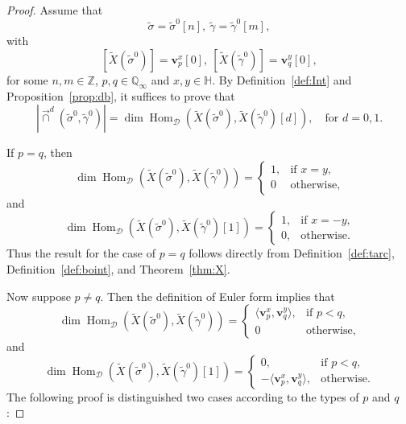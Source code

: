 \documentclass[11pt,a4paper,reqno]{amsart}%
\theoremstyle{plain}
\theoremstyle{definition}
\numberwithin{equation}{section}
\numberwithin{equation}{section}
\def\<{\langle}
\def\>{\rangle}
\def\ZZ{\mathbb{Z}}
\newcommand{\cD}{\mathcal{D}}
\newcommand{\QQi}{\mathbb{Q}_\infty}
\newcommand{\Hom}{\operatorname{Hom}\nolimits}
\newcommand{\bv}{\mathbf{v}}
\def\Hom{\operatorname{Hom}}
\def\wX{\widetilde{X}}
\newcommand{\bfH}{\mathbb{H}}
\begin{document}
 \begin{proof} 
 Assume that
 \[\widetilde{\sigma}=\widetilde{\sigma}^0[n],\ \widetilde{\gamma}=\widetilde{\gamma}^0[m],\] with
 \[[\wX(\widetilde{\sigma}^0)]  =\bv_p^x[0],\  [ \wX(\widetilde{\gamma}^0)]  =\bv_q^y[0],\] 
for some $n,m\in\ZZ$, $p, q\in\QQi$ and $x,y\in\bfH$.
By  Definition~\ref{def:Int}  and Proposition~\ref{prop:db}, it suffices to prove that  
\begin{equation}
\label{int=dimH}|\overrightarrow{\cap}^d(\widetilde{\sigma}^0 ,\widetilde{\gamma}^0 )|=\dim\Hom_{\cD} ( \wX(\widetilde{\sigma}^0),\wX(\widetilde{\gamma}^0) [d] ),  \quad \text{for } d = 0, 1.
\end{equation} 

If  $p = q$, then 
\[
\dim\Hom_{\cD} ( \wX(\widetilde{\sigma}^0),\wX(\widetilde{\gamma}^0) )=\begin{cases}
   1, &\text{if $x=y$,}\\
    0&\text{otherwise,}
\end{cases}
\]
and
\[
\dim\Hom_{\cD} ( \wX(\widetilde{\sigma}^0),\wX(\widetilde{\gamma}^0)[1]  )=\begin{cases}
    1, &\text{if $x=-y$,}\\
    0,&\text{otherwise.}
\end{cases}
\]
Thus the result for the case of $p = q$ follows directly from Definition~\ref{def:tarc}, Definition~\ref{def:boint}, and Theorem~\ref{thm:X}.

Now suppose $p \ne q$. Then the definition of Euler form implies that
\[
\dim\Hom_{\cD} ( \wX(\widetilde{\sigma}^0),\wX(\widetilde{\gamma}^0) )=\begin{cases}
    \<\bv_p^x,\bv_q^y\>, &\text{if $p<q$,}\\
    0&\text{otherwise,}
\end{cases}
\]
and
\[
\dim\Hom_{\cD} ( \wX(\widetilde{\sigma}^0),\wX(\widetilde{\gamma}^0)[1]  )=\begin{cases}
    0, &\text{if $p<q$,}\\
    -\<\bv_p^x,\bv_q^y\>,&\text{otherwise.}
\end{cases}
\]
The following proof is distinguished two cases according to the types of  $p$  and  $q$:


\end{proof}
\end{document}
